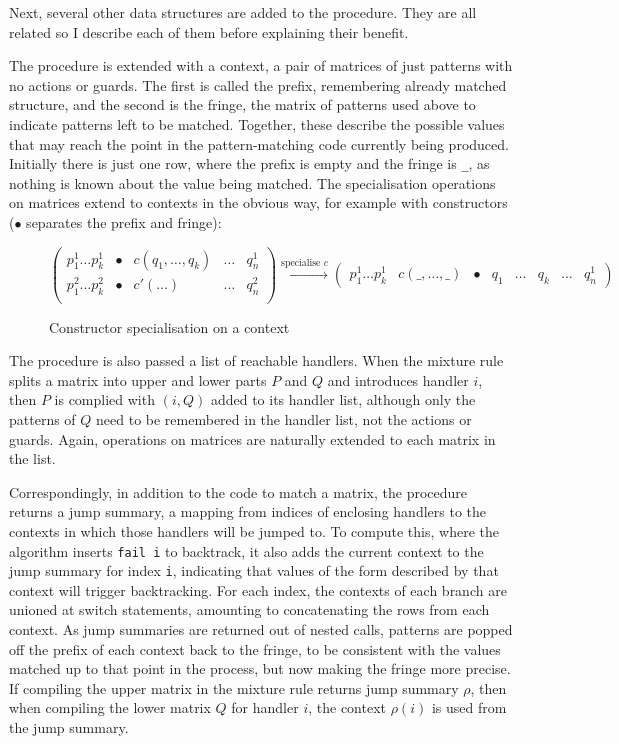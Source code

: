 Next, several other data structures are added to the procedure. They are all related so I describe each of them before explaining their benefit. 

The procedure is extended with a context, a pair of matrices of just patterns with no actions or guards. The first is called the prefix, remembering already matched structure, and the second is the fringe, the matrix of patterns used above to indicate patterns left to be matched. Together, these describe the possible values that may reach the point in the pattern-matching code currently being produced. Initially there is just one row, where the prefix is empty and the fringe is \verb|_|, as nothing is known about the value being matched. The specialisation operations on matrices extend to contexts in the obvious way, for example with constructors ($\bullet$ separates the prefix and fringe):

\begin{figure}[H]
$
\begin{pmatrix}
 p^1_1 \dots  p^1_k & \bullet & c(q_1, \dots, q_k) & \dots & q^1_n \\
 p^2_1 \dots  p^2_k &\bullet & c'(\dots)  & \dots & q^2_n  \\
\end{pmatrix}
\xrightarrow{\text{specialise } c}
\begin{pmatrix}
p^1_1 \dots  p^1_k  & c(\_, \dots, \_) & \bullet &  q_1 & \dots & q_k & \dots &  q^1_n 
\end{pmatrix}
$
\caption{Constructor specialisation on a context}
\end{figure}

The procedure is also passed a list of reachable handlers. When the mixture rule splits a matrix into upper and lower parts $P$ and $Q$ and introduces handler $i$, then $P$ is complied with $(i, Q)$ added to its handler list, although only the patterns of $Q$ need to be remembered in the handler list, not the actions or guards. Again, operations on matrices are naturally extended to each matrix in the list. 

Correspondingly, in addition to the code to match a matrix, the procedure returns a jump summary, a mapping from indices of enclosing handlers to the contexts in which those handlers will be jumped to. To compute this, where the algorithm inserts \verb|fail i| to backtrack, it also adds the current context to the jump summary for index \verb|i|, indicating that values of the form described by that context will trigger backtracking. For each index, the contexts of each branch are unioned at switch statements, amounting to concatenating the rows from each context. As jump summaries are returned out of nested calls, patterns are popped off the prefix of each context back to the fringe, to be consistent with the values matched up to that point in the process, but now making the fringe more precise. 
If compiling the upper matrix in the mixture rule returns jump summary $\rho$, then when compiling the lower matrix $Q$ for handler $i$, the context $\rho(i)$ is used from the jump summary.


